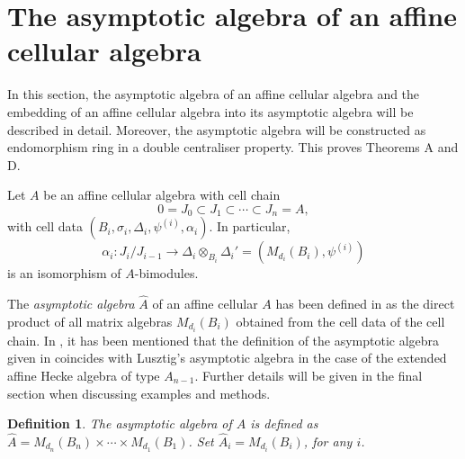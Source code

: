 \documentclass[oneside, a4paper, 11pt]{amsart}
\newtheorem{definition}[theorem]{Definition }
\newcommand{\asym}{\widehat{A}}
\newcommand{\End}{\mathrm{End}}
\begin{document}
\section{The asymptotic algebra of an affine cellular algebra}

In this section, the asymptotic algebra of an affine cellular algebra
and the embedding of an affine cellular algebra into its asymptotic algebra
will be described in detail. Moreover, the asymptotic algebra will be
constructed as endomorphism ring in a double centraliser property.
This proves Theorems A and D. 

Let $A$ be an affine cellular algebra with cell chain 
\begin{equation}\label{notation:cellchain}
  0=J_0 \subset J_1 \subset \cdots \subset J_n=A,\end{equation} with cell data 
$(B_i, \sigma_i, \Delta_i, \psi^{(i)}, \alpha_i)$. 
In particular, 
\begin{equation}\label{notation:celldata}\alpha_i: J_i/J_{i-1} \to \Delta_i\otimes_ {B_i} \Delta_i' = (M_{d_i}(B_i),\psi^{(i)})\end{equation}
is an isomorphism of $A$-bimodules.


The \emph{asymptotic algebra} $\asym$ of an affine cellular $A$ has been
defined in \cite{KXaffine} as the direct product of all matrix algebras
$M_{d_i}(B_i)$ obtained from the cell data of the cell chain. In
\cite[comment before Lemma 5.5 on page 177]{KXaffine}, it has been mentioned
that the definition of the asymptotic algebra given in \cite{KXaffine}
coincides with Lusztig's asymptotic algebra in the case of the extended affine
Hecke algebra of type $A_{n-1}$. Further details will be given in the final
section when discussing examples and methods.


\begin{definition}
  The asymptotic algebra of $A$ is defined as 
$\asym = M_{d_n}(B_n) \times \cdots \times M_{d_1}(B_1)$. Set $\asym_i = M_{d_i}(B_i)$, for any $i$.
\end{definition}
\end{document}

